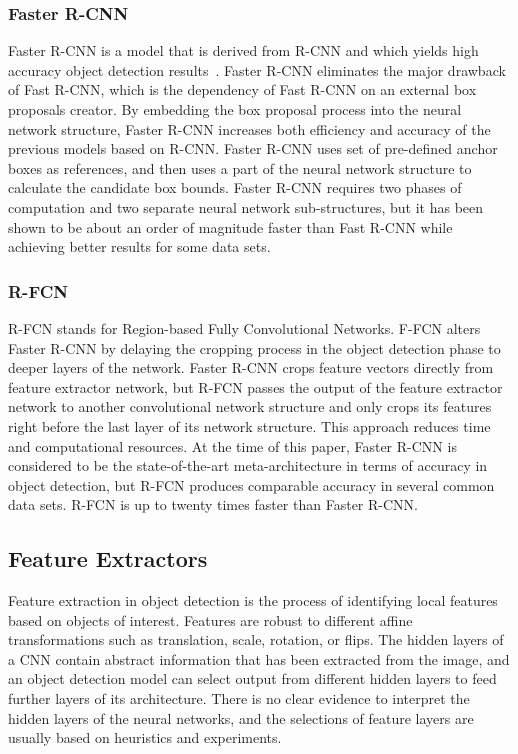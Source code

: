 \documentclass[conference]{IEEEtran}
\begin{document}
\subsubsection{Faster R-CNN}
Faster R-CNN is a model that is derived from R-CNN and which yields high accuracy object detection results~\cite{girshick2015fast}. 
Faster R-CNN eliminates the major drawback of Fast R-CNN, which is the dependency of Fast R-CNN on an external box proposals creator. 
By embedding the box proposal process into the neural network structure, Faster R-CNN increases both efficiency and accuracy of the previous models based on R-CNN.  
Faster R-CNN uses set of pre-defined anchor boxes as references, and then uses a part of the neural network structure to calculate the candidate box bounds.   
Faster R-CNN requires two phases of computation and two separate neural network sub-structures,
but it has been shown to be about an order of magnitude faster than Fast R-CNN while achieving better results for some data sets. 

\subsubsection{R-FCN}
R-FCN stands for Region-based Fully Convolutional Networks.  F-FCN alters Faster R-CNN by delaying the cropping process in the object detection phase to deeper layers of the network. 
Faster R-CNN crops feature vectors directly from feature extractor network, but R-FCN passes the output of the feature extractor network to another convolutional network structure and only crops its features right before the last layer of its network structure. 
This approach reduces time and computational resources.
At the time of this paper, Faster R-CNN is considered to be the state-of-the-art meta-architecture in terms of accuracy in object detection, but R-FCN produces comparable accuracy in several common data sets.
R-FCN is up to twenty times faster than Faster R-CNN.

\subsection{Feature Extractors}
Feature extraction in object detection is the process of identifying local features based on objects of interest.  
Features are robust to different affine transformations such as translation, scale, rotation, or flips.
The hidden layers of a CNN contain abstract information that has been extracted from the image, and an
object detection model can select output from different hidden layers to feed further layers of its architecture.
There is no clear evidence to interpret the hidden layers of the neural networks, and the selections of feature layers are usually based on heuristics and experiments. 
\end{document}
